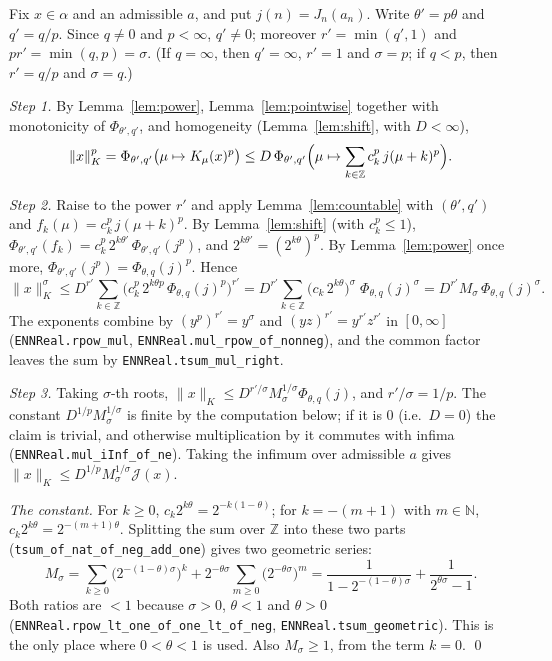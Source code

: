 \documentclass[11pt]{article}
\theoremstyle{definition}
\theoremstyle{remark}
\newcommand{\norm}[2]{\lVert #1\rVert_{#2}}
\newcommand{\cJ}{\mathcal J}
\newcommand{\Z}{\mathbb Z}
\newcommand{\N}{\mathbb N}
\begin{document}
Fix \(x \in \alpha\) and an admissible \(a\), and put \(j(n) = J_n(a_n)\). Write
\(\theta' = p\theta\) and \(q' = q/p\). Since \(q \ne 0\) and \(p < \infty\), \(q' \ne 0\);
moreover \(r' = \min(q',1)\) and \(p r' = \min(q, p) = \sigma\). (If \(q = \infty\), then
\(q' = \infty\), \(r' = 1\) and \(\sigma = p\); if \(q < p\), then \(r' = q/p\) and
\(\sigma = q\).)

\emph{Step 1.} By Lemma~\ref{lem:power}, Lemma~\ref{lem:pointwise} together with monotonicity of
\(\Phi_{\theta',q'}\), and homogeneity (Lemma~\ref{lem:shift}, with \(D < \infty\)),
\[
  \norm{x}{K}^p = \Phi_{\theta',q'}\bigl(\mu \mapsto K_\mu(x)^p\bigr)
  \le D\,\Phi_{\theta',q'}\Bigl(\mu \mapsto \sum_{k \in \Z} c_k^p\, j(\mu+k)^p\Bigr).
\]

\emph{Step 2.} Raise to the power \(r'\) and apply Lemma~\ref{lem:countable} with
\((\theta',q')\) and \(f_k(\mu) = c_k^p\, j(\mu+k)^p\). By Lemma~\ref{lem:shift} (with
\(c_k^p \le 1\)), \(\Phi_{\theta',q'}(f_k) = c_k^p\, 2^{k\theta'}\,\Phi_{\theta',q'}(j^p)\), and
\(2^{k\theta'} = (2^{k\theta})^p\). By Lemma~\ref{lem:power} once more,
\(\Phi_{\theta',q'}(j^p) = \Phi_{\theta,q}(j)^p\). Hence
\[
  \norm{x}{K}^{\sigma}
  \le D^{r'}\sum_{k\in\Z}\bigl(c_k^p\,2^{k\theta p}\,\Phi_{\theta,q}(j)^p\bigr)^{r'}
  = D^{r'}\sum_{k\in\Z}\bigl(c_k\,2^{k\theta}\bigr)^{\sigma}\;\Phi_{\theta,q}(j)^{\sigma}
  = D^{r'} M_\sigma\,\Phi_{\theta,q}(j)^{\sigma}.
\]
The exponents combine by \((y^p)^{r'} = y^{\sigma}\) and \((yz)^{r'} = y^{r'}z^{r'}\) in
\([0,\infty]\) (\texttt{ENNReal.rpow\_mul}, \texttt{ENNReal.mul\_rpow\_of\_nonneg}), and the
common factor leaves the sum by \texttt{ENNReal.tsum\_mul\_right}.

\emph{Step 3.} Taking \(\sigma\)-th roots, \(\norm{x}{K} \le D^{r'/\sigma} M_\sigma^{1/\sigma}
\Phi_{\theta,q}(j)\), and \(r'/\sigma = 1/p\). The constant \(D^{1/p}M_\sigma^{1/\sigma}\) is
finite by the computation below; if it is \(0\) (i.e.\ \(D = 0\)) the claim is trivial, and
otherwise multiplication by it commutes with infima (\texttt{ENNReal.mul\_iInf\_of\_ne}). Taking
the infimum over admissible \(a\) gives \(\norm{x}{K} \le D^{1/p}M_\sigma^{1/\sigma}\cJ(x)\).

\emph{The constant.} For \(k \ge 0\), \(c_k 2^{k\theta} = 2^{-k(1-\theta)}\); for
\(k = -(m+1)\) with \(m \in \N\), \(c_k 2^{k\theta} = 2^{-(m+1)\theta}\). Splitting the sum
over \(\Z\) into these two parts (\texttt{tsum\_of\_nat\_of\_neg\_add\_one}) gives two geometric
series:
\[
  M_\sigma = \sum_{k \ge 0}\bigl(2^{-(1-\theta)\sigma}\bigr)^k
  + 2^{-\theta\sigma}\sum_{m \ge 0}\bigl(2^{-\theta\sigma}\bigr)^m
  = \frac{1}{1 - 2^{-(1-\theta)\sigma}} + \frac{1}{2^{\theta\sigma} - 1}.
\]
Both ratios are \(< 1\) because \(\sigma > 0\), \(\theta < 1\) and \(\theta > 0\)
(\texttt{ENNReal.rpow\_lt\_one\_of\_one\_lt\_of\_neg}, \texttt{ENNReal.tsum\_geometric}). This is
the only place where \(0 < \theta < 1\) is used. Also \(M_\sigma \ge 1\), from the term
\(k = 0\). \qed
\end{document}
